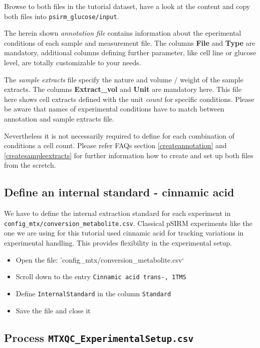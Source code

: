\documentclass[]{book}
\providecommand{\tightlist}{%
  \setlength{\itemsep}{0pt}\setlength{\parskip}{0pt}}
\theoremstyle{definition}
\theoremstyle{definition}
\theoremstyle{definition}
\theoremstyle{remark}
\begin{document}
Browse to both files in the tutorial dataset, have a look at the content
and copy both files into \texttt{psirm\_glucose/input}.

The herein shown \emph{annotation file} contains information about the
eperimental conditions of each sample and measurement file. The columns
\textbf{File} and \textbf{Type} are mandatory, additional columns
defining further parameter, like cell line or glucose level, are totally
customizable to your needs.

The \emph{sample extracts} file specify the nature and volume / weight
of the sample extracts. The columns \textbf{Extract\_vol} and
\textbf{Unit} are mandatory here. This file here shows cell extracts
defined with the unit \emph{count} for specific conditions. Please be
aware that names of experimental conditions have to match between
annotation and sample extracts file.

Nevertheless it is not necessarily required to define for each
combination of conditions a cell count. Please refer FAQs section
\ref{createannotation} and \ref{createsampleextracts} for further
information how to create and set up both files from the scretch.

\subsection{Define an internal standard - cinnamic
acid}\label{define-an-internal-standard---cinnamic-acid}

We have to define the internal extraction standard for each experiment
in \texttt{config\_mtx/conversion\_metabolite.csv}. Classical pSIRM
experiments like the one we are using for this tutorial used cinnamic
acid for tracking variations in experimental handling. This provides
flexibility in the experimental setup.

\begin{itemize}
\tightlist
\item
  Open the file: 'config\_mtx/conversion\_metabolite.csv`
\item
  Scroll down to the entry \texttt{Cinnamic\ acid\ trans-,\ 1TMS}
\item
  Define \texttt{InternalStandard} in the column \texttt{Standard}
\item
  Save the file and close it
\end{itemize}

\subsection{\texorpdfstring{Process
\texttt{MTXQC\_ExperimentalSetup.csv}}{Process MTXQC\_ExperimentalSetup.csv}}\label{process-mtxqc_experimentalsetup.csv}
\end{document}
